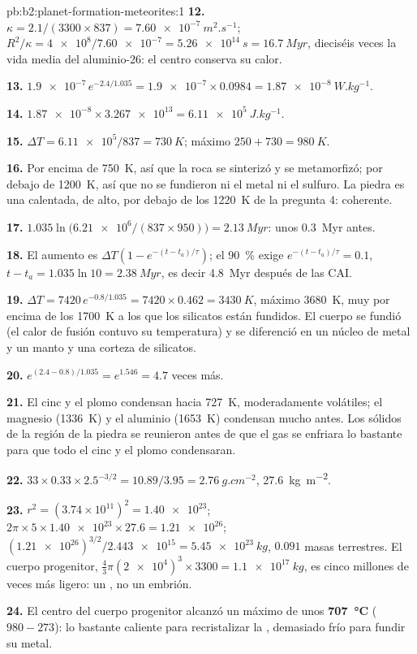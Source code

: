 \begin{solution}{pb:b2:planet-formation-meteorites:1}
\textbf{12.} $\kappa = 2.1/(3300\times837) = \qty{7.60e-7}{m^2.s^{-1}}$;
$R^2/\kappa = \num{4e8}/\num{7.60e-7} = \qty{5.26e14}{s} = \qty{16.7}{Myr}$, dieciséis
veces la vida media del aluminio-26: el centro conserva su calor.

\textbf{13.} $\num{1.9e-7}\,e^{-2.4/1.035} = \num{1.9e-7}\times0.0984 =
\qty{1.87e-8}{W.kg^{-1}}$.

\textbf{14.} $\num{1.87e-8}\times\num{3.267e13} = \qty{6.11e5}{J.kg^{-1}}$.

\textbf{15.} $\Delta T = \num{6.11e5}/837 = \qty{730}{K}$; máximo
$250 + 730 = \qty{980}{K}$.

\textbf{16.} Por encima de \qty{750}{K}, así que la roca se sinterizó y se metamorfizó; por debajo de
\qty{1200}{K}, así que no se fundieron ni el metal ni el sulfuro. La piedra es una  calentada,
de  alto, por debajo de los \qty{1220}{K} de la pregunta 4: coherente.

\textbf{17.} $1.035\ln\bigl(\num{6.21e6}/(837\times950)\bigr) = \qty{2.13}{Myr}$:
unos \qty{0.3}{Myr} antes.

\textbf{18.} El aumento es $\Delta T(1 - e^{-(t - t_a)/\tau})$; el \qty{90}{\percent}
exige $e^{-(t - t_a)/\tau} = 0.1$, $t - t_a = 1.035\ln10 = \qty{2.38}{Myr}$, es decir
\qty{4.8}{Myr} después de las CAI.

\textbf{19.} $\Delta T = 7420\,e^{-0.8/1.035} = 7420\times0.462 = \qty{3430}{K}$,
máximo \qty{3680}{K}, muy por encima de los \qty{1700}{K} a los que los silicatos están fundidos.
El cuerpo se fundió (el calor de fusión contuvo su temperatura) y se
diferenció en un núcleo de metal y un manto y una corteza de silicatos.

\textbf{20.} $e^{(2.4 - 0.8)/1.035} = e^{1.546} = 4.7$ veces más.

\textbf{21.} El cinc y el plomo condensan hacia \qty{727}{K}, moderadamente volátiles; el magnesio
(\qty{1336}{K}) y el aluminio (\qty{1653}{K}) condensan mucho antes. Los sólidos de
la región de la piedra se reunieron antes de que el gas se enfriara lo bastante para que todo el cinc y el
plomo condensaran.

\textbf{22.} $33\times0.33\times2.5^{-3/2} = 10.89/3.95 = \qty{2.76}{g.cm^{-2}}$,
\qty{27.6}{kg.m^{-2}}.

\textbf{23.} $r^2 = (3.74\times10^{11})^2 = \num{1.40e23}$;
$2\pi\times5\times\num{1.40e23}\times27.6 = \num{1.21e26}$;
$(\num{1.21e26})^{3/2}/\num{2.443e15} = \qty{5.45e23}{kg}$, $0.091$ masas terrestres.
El cuerpo progenitor, $\tfrac43\pi(\num{2e4})^3\times3300 = \qty{1.1e17}{kg}$, es cinco
millones de veces más ligero: un , no un embrión.

\textbf{24.} El centro del cuerpo progenitor alcanzó un máximo de unos
\textbf{\qty[text-series-to-math=true]{707}{\degreeCelsius}} ($980 - 273$): lo bastante caliente para
recristalizar la , demasiado frío para fundir su metal.
\end{solution}
